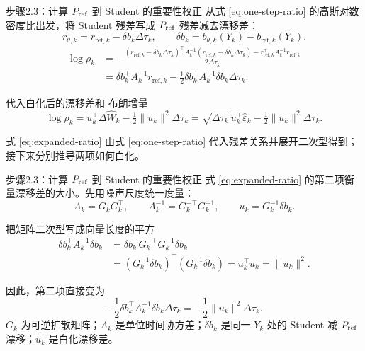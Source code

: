 \documentclass[10pt,aspectratio=169]{beamer}
\begin{document}
\begin{frame}{步骤2.3：计算 \ensuremath{P_{\rm ref}} 到 Student 的重要性校正}
\small
从式 \eqref{eq:one-step-ratio} 的高斯对数密度比出发，将 Student 残差写成 \ensuremath{P_{\rm ref}} 残差减去漂移差：
\begin{equation}
r_{\theta,k}=r_{\mathrm{ref},k}-\delta b_k \Delta\tau_k,\qquad
\delta b_k=b_{\theta,k}(Y_k)-b_{\mathrm{ref},k}(Y_k).
\end{equation}
\begin{equation}\label{eq:expanded-ratio}
\begin{aligned}
\log\rho_k
&=-\frac{(r_{\mathrm{ref},k}-\delta b_k\Delta\tau_k)^\top A_k^{-1}(r_{\mathrm{ref},k}-\delta b_k\Delta\tau_k)
-r_{\mathrm{ref},k}^\top A_k^{-1}r_{\mathrm{ref},k}}{2\Delta\tau_k}\\
&=\delta b_k^\top A_k^{-1}r_{\mathrm{ref},k}
-\frac12\delta b_k^\top A_k^{-1}\delta b_k \Delta\tau_k.
\end{aligned}
\end{equation}
\begin{block}{代入白化后的漂移差和 布朗增量}
\begin{equation}\label{eq:whitened-ratio}
\boxed{\log\rho_k=u_k^\top\Delta\widehat W_k-\tfrac12\|u_k\|^2\Delta\tau_k}
=\sqrt{\Delta\tau_k}\,u_k^\top\widehat\varepsilon_k-\tfrac12\|u_k\|^2\Delta\tau_k.
\end{equation}
\end{block}
式 \eqref{eq:expanded-ratio} 由式 \eqref{eq:one-step-ratio} 代入残差关系并展开二次型得到；接下来分别推导两项如何白化。
\end{frame}

\begin{frame}{步骤2.3：计算 \ensuremath{P_{\rm ref}} 到 Student 的重要性校正}
\small
式 \eqref{eq:expanded-ratio} 的第二项衡量漂移差的大小。先用噪声尺度统一度量：
\begin{equation}
A_k=G_kG_k^\top,\qquad
A_k^{-1}=G_k^{-\top}G_k^{-1},\qquad
u_k=G_k^{-1}\delta b_k.
\end{equation}
\begin{block}{把矩阵二次型写成向量长度的平方}
\begin{equation}
\begin{aligned}
\delta b_k^\top A_k^{-1}\delta b_k
&=\delta b_k^\top G_k^{-\top}G_k^{-1}\delta b_k\\
&=(G_k^{-1}\delta b_k)^\top(G_k^{-1}\delta b_k)
=u_k^\top u_k=\|u_k\|^2.
\end{aligned}
\end{equation}
\end{block}
因此，第二项直接变为
\begin{equation}
\boxed{-\frac12\delta b_k^\top A_k^{-1}\delta b_k\Delta\tau_k
=-\frac12\|u_k\|^2\Delta\tau_k.}
\end{equation}
$G_k$ 为可逆扩散矩阵；$A_k$ 是单位时间协方差；$\delta b_k$ 是同一 $Y_k$ 处的 Student 减 \ensuremath{P_{\rm ref}} 漂移；$u_k$ 是白化漂移差。
\end{frame}
\end{document}

